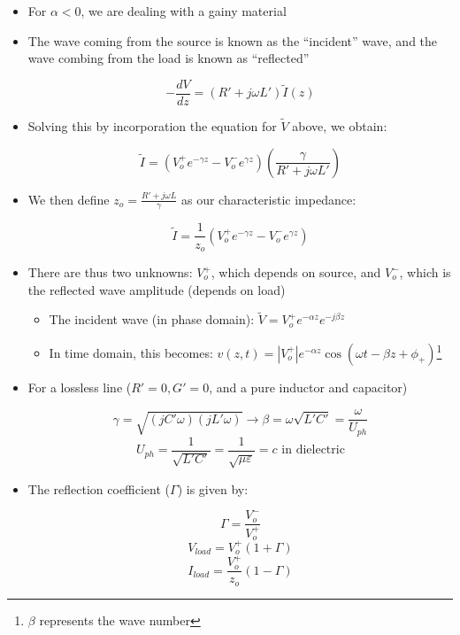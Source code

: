 \begin{itemize}
\begin{itemize}
    \item For $\alpha<0$, we are dealing with a gainy material

    \item The wave coming from the source is known as the ``incident'' wave, and the wave combing from the load is known as ``reflected''

      $$-\frac{dV}{dz}=(R'+j\omega L')\widetilde{I}(z)$$

    \item Solving this by incorporation the equation for $\widetilde{V}$ above, we obtain:

      $$\widetilde{I}=\left( V_o^+e^{-\gamma z}-V_o^-e^{\gamma z} \right)\left( \frac{\gamma}{R'+j\omega L'} \right)$$

    \item We then define $z_o=\displaystyle \frac{R'+j\omega L}{\gamma}$ as our characteristic impedance:

      $$\widetilde{I}=\frac{1}{z_o}\left( V_o^+e^{-\gamma z}-V_o^-e^{\gamma z} \right)$$

    \item There are thus two unknowns: $V_o^+$, which depends on source, and $V_o^-$, which is the reflected wave amplitude (depends on load)

      \begin{itemize}

        \item The incident wave (in phase domain): $\widetilde{V}=V_o^+e^{-\alpha z}e^{-j\beta z}$

        \item In time domain, this becomes: $v(z,t)=|V_o^+|e^{-\alpha z}\cos(\omega t-\beta z+\phi_+)$\footnote{$\beta$ represents the wave number}

      \end{itemize}

    \item For a lossless line ($R'=0,G'=0$, and a pure inductor and capacitor)

      $$\gamma=\sqrt{(jC'\omega)(jL'\omega)}\rightarrow\beta=\omega\sqrt{L'C'}=\frac{\omega}{U_{ph}}$$
      $$U_{ph}=\frac{1}{\sqrt{L'C'}}=\frac{1}{\sqrt{\mu\varepsilon}}=c\text{ in dielectric}$$

    \item The reflection coefficient ($\Gamma$) is given by:

      $$\Gamma=\frac{V_o^-}{V_o^+}$$
      $$V_{load}=V_o^+(1+\Gamma)$$
      $$I_{load}=\frac{V_o^+}{z_o}(1-\Gamma)$$


\end{itemize}
\end{itemize}
